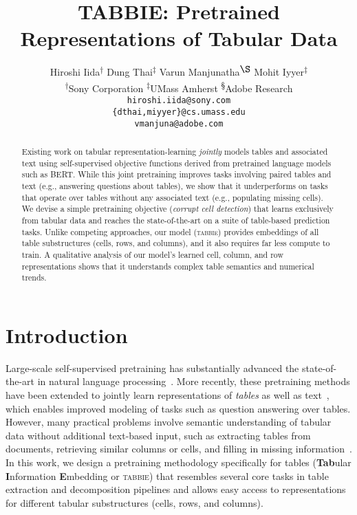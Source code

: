 \documentclass[11pt]{article}
\title{TABBIE: Pretrained Representations of Tabular Data}
\author{Hiroshi Iida\textsuperscript{\textnormal{\ensuremath{\dagger}}}\hspace{0.5cm}
Dung Thai\textsuperscript{\textnormal{\ensuremath{\ddagger}}}\hspace{0.5cm}
Varun Manjunatha\textsuperscript{\textnormal{\ensuremath{\S}}}\hspace{0.5cm}
Mohit Iyyer\textsuperscript{\textnormal{\ensuremath{\ddagger}}} \\
\textsuperscript{\ensuremath{\dagger}}Sony Corporation\hspace{0.5cm}
\textsuperscript{\ensuremath{\ddagger}}UMass Amherst\hspace{0.5cm}
\textsuperscript{\S}Adobe Research \\
\texttt{\normalsize hiroshi.iida@sony.com} \\
\texttt{\normalsize\{dthai,miyyer\}@cs.umass.edu} \\
\texttt{\normalsize vmanjuna@adobe.com}
}
\newcommand{\name}[0]{\textsc{tabbie}}
\begin{document}
\maketitle

\begin{abstract}

Existing work on tabular representation-learning \emph{jointly} models tables and associated text using self-supervised objective functions derived from pretrained language models such as BERT. While this joint pretraining improves tasks involving paired tables and text (e.g., answering questions about tables), we show that it underperforms on tasks that operate over tables without any associated text (e.g., populating missing cells). We devise a simple pretraining objective (\emph{corrupt cell detection}) that learns exclusively from tabular data and reaches the state-of-the-art on a suite of table-based prediction tasks. Unlike competing approaches, our model (\name) provides embeddings of all table substructures (cells, rows, and columns), and it also requires far less compute to train. A qualitative analysis of our model's learned cell, column, and row representations shows that it understands complex table semantics and numerical trends. 
\end{abstract}

 \section{Introduction}
\label{sec:introduction}



Large-scale self-supervised pretraining has substantially advanced the state-of-the-art in natural language processing~\citep{Peters:2018,devlin2018bert,Liu2019RoBERTaAR}. More recently, these pretraining methods have been extended to jointly learn representations of \emph{tables} as well as text~\citep{Herzig2020TAPASWS,yin20acl}, which enables improved modeling of tasks such as question answering over tables. However, many practical problems involve semantic understanding of tabular data without additional text-based input, such as extracting tables from documents, retrieving similar columns or cells, and filling in missing information~\cite{10.1145/3372117}. In this work, we design a pretraining methodology specifically for tables (\textbf{Tab}ular \textbf{I}nformation \textbf{E}mbedding or \name) that resembles several core tasks in table extraction and decomposition pipelines and allows easy access to representations for different tabular substructures (cells, rows, and columns).
\end{document}
